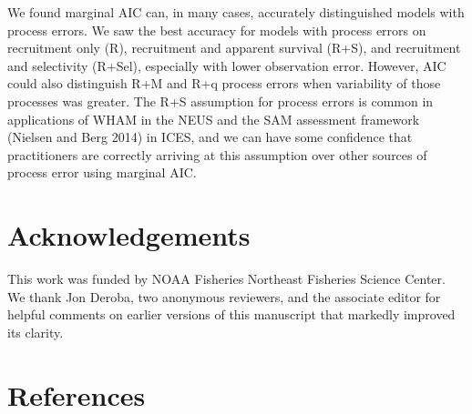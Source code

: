 \documentclass[
  12pt,
]{article}
\begin{document}
We found marginal AIC can, in many cases, accurately distinguished
models with process errors. We saw the best accuracy for models with
process errors on recruitment only (R), recruitment and apparent
survival (R+S), and recruitment and selectivity (R+Sel), especially with
lower observation error. However, AIC could also distinguish R+M and R+q
process errors when variability of those processes was greater. The R+S
assumption for process errors is common in applications of WHAM in the
NEUS and the SAM assessment framework (Nielsen and Berg 2014) in ICES,
and we can have some confidence that practitioners are correctly
arriving at this assumption over other sources of process error using
marginal AIC.

\section*{Acknowledgements}\label{acknowledgements}

This work was funded by NOAA Fisheries Northeast Fisheries Science
Center. We thank Jon Deroba, two anonymous reviewers, and the associate
editor for helpful comments on earlier versions of this manuscript that
markedly improved its clarity.

\pagebreak

\section*{References}\label{references}
\end{document}
